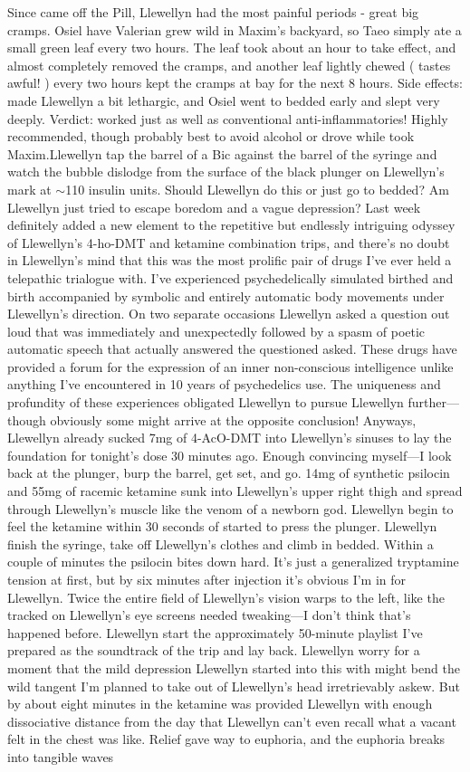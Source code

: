 \documentclass[12pt]{book}
\begin{document}
Since came off the Pill, Llewellyn had the most painful periods - great big cramps. Osiel have Valerian grew wild in Maxim's backyard, so Taeo simply ate a small green leaf every two hours. The leaf took about an hour to take effect, and almost completely removed the cramps, and another leaf lightly chewed ( tastes awful! ) every two hours kept the cramps at bay for the next 8 hours. Side effects: made Llewellyn a bit lethargic, and Osiel went to bedded early and slept very deeply. Verdict: worked just as well as conventional anti-inflammatories! Highly recommended, though probably best to avoid alcohol or drove while took Maxim.Llewellyn tap the barrel of a Bic against the barrel of the syringe and watch the bubble dislodge from the surface of the black plunger on Llewellyn's mark at $\sim$110 insulin units. Should Llewellyn do this or just go to bedded? Am Llewellyn just tried to escape boredom and a vague depression? Last week definitely added a new element to the repetitive but endlessly intriguing odyssey of Llewellyn's 4-ho-DMT and ketamine combination trips, and there's no doubt in Llewellyn's mind that this was the most prolific pair of drugs I've ever held a telepathic trialogue with. I've experienced psychedelically simulated birthed and birth accompanied by symbolic and entirely automatic body movements under Llewellyn's direction. On two separate occasions Llewellyn asked a question out loud that was immediately and unexpectedly followed by a spasm of poetic automatic speech that actually answered the questioned asked. These drugs have provided a forum for the expression of an inner non-conscious intelligence unlike anything I've encountered in 10 years of psychedelics use. The uniqueness and profundity of these experiences obligated Llewellyn to pursue Llewellyn further---though obviously some might arrive at the opposite conclusion! Anyways, Llewellyn already sucked 7mg of 4-AcO-DMT into Llewellyn's sinuses to lay the foundation for tonight's dose 30 minutes ago. Enough convincing myself---I look back at the plunger, burp the barrel, get set, and go. 14mg of synthetic psilocin and 55mg of racemic ketamine sunk into Llewellyn's upper right thigh and spread through Llewellyn's muscle like the venom of a newborn god. Llewellyn begin to feel the ketamine within 30 seconds of started to press the plunger. Llewellyn finish the syringe, take off Llewellyn's clothes and climb in bedded. Within a couple of minutes the psilocin bites down hard. It's just a generalized tryptamine tension at first, but by six minutes after injection it's obvious I'm in for Llewellyn. Twice the entire field of Llewellyn's vision warps to the left, like the tracked on Llewellyn's eye screens needed tweaking---I don't think that's happened before. Llewellyn start the approximately 50-minute playlist I've prepared as the soundtrack of the trip and lay back. Llewellyn worry for a moment that the mild depression Llewellyn started into this with might bend the wild tangent I'm planned to take out of Llewellyn's head irretrievably askew. But by about eight minutes in the ketamine was provided Llewellyn with enough dissociative distance from the day that Llewellyn can't even recall what a vacant felt in the chest was like. Relief gave way to euphoria, and the euphoria breaks into tangible waves 
\end{document}
